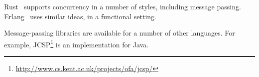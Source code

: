 Rust~\cite{rust} supports concurrency in a number of styles, including message
  passing.
Erlang~\cite{erlang} uses similar ideas, in a functional setting.

Message-passing libraries are available for a number of other languages.  For
example, JCSP\footnote{\url{http://www.cs.kent.ac.uk/projects/ofa/jcsp/}} is
an implementation  for Java.








\exercises








